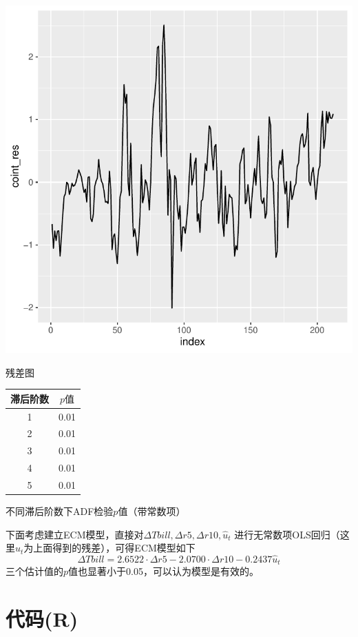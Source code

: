 \documentclass[cn]{homework}
\begin{document}
    \begin{marginfigure}
        \centering
        \includegraphics[width=\textwidth]{residual}
        \caption{残差图}
        \label{fig:resid}
    \end{marginfigure}

    \begin{margintable}
        \centering
        \begin{tabular}{cc}
            \toprule
            滞后阶数 & $p值$ \\
            \midrule
            1 & 0.01 \\ 
            2 & 0.01 \\ 
            3 & 0.01 \\ 
            4 & 0.01 \\ 
            5 & 0.01 \\ 
            \bottomrule
        \end{tabular}
        \caption{不同滞后阶数下ADF检验$p$值（带常数项）}
        \label{tab:ADF resid}
    \end{margintable}

    下面考虑建立ECM模型，直接对$\Delta Tbill,\Delta r5, \Delta r10,\hat u_t$
    进行无常数项OLS回归（这里$\hat u_t$为上面得到的残差），可得ECM模型如下
    \[\Delta Tbill=2.6522\cdot\Delta r5-2.0700\cdot\Delta r10-0.2437\hat u_t\]
    三个估计值的$p$值也显著小于0.05，可以认为模型是有效的。

    \appendix
    \section{代码(R)}
    
\end{document}
